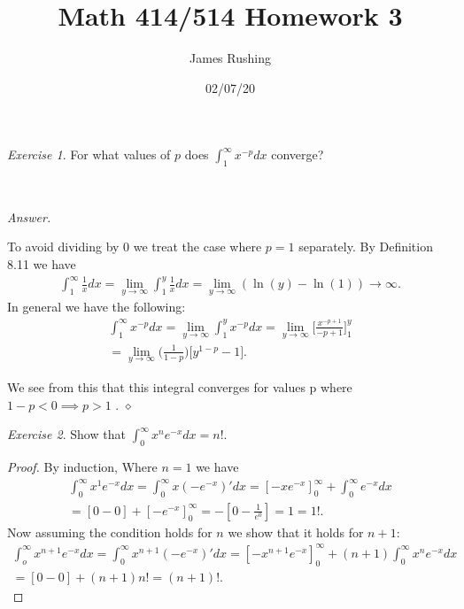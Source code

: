 \documentclass[12pt,oneside]{amsart}
\title{Math 414/514 Homework 3}
\author{James Rushing}
\date{02/07/20}
\theoremstyle{definition}
\theoremstyle{remark}
\newtheorem{exer}{Exercise}
\numberwithin{equation}{exer}
\newenvironment{answer}{\bigskip\noindent\emph{Answer.}}{\hfill$\diamond$\newline}
\begin{document}
\maketitle

\begin{exer}

For what values of $p$ does $\int_1^{\infty}x^{-p}dx$ converge?
\end{exer}



\




\begin{answer}

To avoid dividing by 0 we treat the case where $p=1$ separately. By Definition 8.11 we have 
\begin{align*}
   \int_1^\infty\frac{1}{x}dx = \lim_{y \to \infty} \int_1^y \frac{1}{x}dx=\lim_{y \to \infty}(\ln(y)-\ln(1)) \to \infty .
\end{align*}
In general we have the following: 
\begin{align*}
    \int_1^\infty x^{-p}dx= \lim_{y \to \infty}\int_1^y x^{-p}dx =\lim_{y\to\infty}\Bigg[\frac{x^{-p+1}}{-p+1}\Bigg]_1^y \\
    = \lim_{y \to \infty} \Big(\frac{1}{1-p}\Big)\Big[y^{1-p}-1\Big].
\end{align*}

We see from this that this integral converges for values p where $1-p<0 \implies p>1$ .
\end{answer}


\newpage
\indent \newline
\begin{exer}
Show that $\int_0^\infty x^n e^{-x} dx = n!.$
\end{exer}




\begin{proof}

By induction, Where $n=1$ we have 
\begin{align*}
    \int_0^\infty x^1 e^{-x}dx=\int_0^\infty x(-e^{-x})'dx = [-xe^{-x}]_0^\infty + \int_0^\infty e^{-x}dx\\
    = [0-0] + [-e^{-x}]_0^\infty= -[0 - \frac{1}{e^0}] =1 =1!.
\end{align*}
  Now assuming the condition holds for $n$ we show that it holds for $n+1$:
\begin{align*}
    \int_o^\infty x^{n+1} e^{-x}dx = \int_0^{\infty} x^{n+1}(-e^{-x})'dx = [-x^{n+1}e^{-x}]_0^{\infty} + (n+1)\int_0^\infty x^n e^{-x}dx\\
    = [0 - 0] + (n+1)n! = (n+1)!.
\end{align*}

\end{proof}
\end{document}
